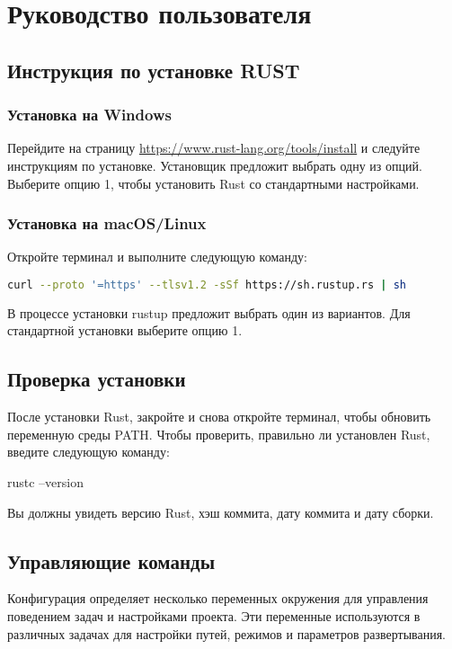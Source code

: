 \section{Руководство пользователя}

\subsection{Инструкция по установке RUST}
\subsubsection{Установка на Windows}
	Перейдите на страницу \url{https://www.rust-lang.org/tools/install} и следуйте инструкциям по установке.
    Установщик предложит выбрать одну из опций. Выберите опцию 1, чтобы установить Rust со стандартными настройками.

\subsubsection{Установка на macOS/Linux}
Откройте терминал и выполните следующую команду:

\begin{lstlisting}[language=bash]
curl --proto '=https' --tlsv1.2 -sSf https://sh.rustup.rs | sh
\end{lstlisting}


В процессе установки rustup предложит выбрать один из вариантов. Для стандартной установки выберите опцию 1.

\subsection{Проверка установки}
После установки Rust, закройте и снова откройте терминал, чтобы обновить
переменную среды PATH. Чтобы проверить, правильно ли установлен Rust,
введите следующую команду:

\begin{lstinline}[language=bash]
	rustc --version
\end{lstinline}


Вы должны увидеть версию Rust, хэш коммита, дату коммита и дату сборки.

\subsection{Управляющие команды}

Конфигурация определяет несколько переменных окружения для управления поведением задач и настройками проекта. Эти переменные используются в различных задачах для настройки путей, режимов и параметров развертывания.


